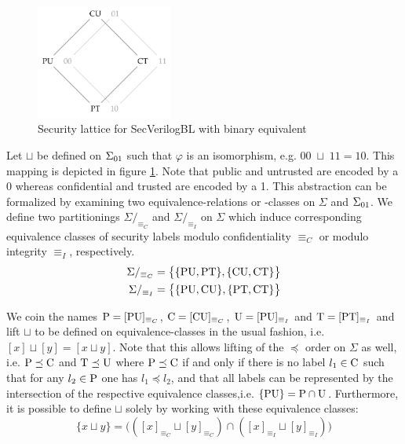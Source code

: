 \begin{figure}
    \centering
    \includegraphics[width=0.4\textwidth]{figures/binary-lattice.png}
    \caption{Security lattice for SecVerilogBL \cite{Ferraiuolo17} with binary equivalent}
    \label{fig:sec-lattice-bin}
\end{figure}

Let $ \sqcup $ be defined on $ \binSigma $ such that $ \varphi $ is an isomorphism, e.g. $ 00 \; \sqcup \; 11 = 10 $.
This mapping is depicted in figure \ref{fig:sec-lattice-bin}.
Note that public and untrusted are encoded by a 0 whereas confidential and trusted are encoded by a 1.
This abstraction can be formalized by examining two equivalence-relations or -classes on $ \Sigma $ and $ \binSigma $.
We define two partitionings $ \Sigma/_{\equiv_C} $ and $ \Sigma/_{\equiv_I} $ on $ \Sigma $ which induce corresponding equivalence classes of security labels modulo confidentiality $ \equiv_C $ or modulo integrity $ \equiv_I $, respectively.
\begin{align*}
    \Sigma /_{\equiv_C} &= \big\{ \{ \PU, \PT \}, \{ \CU, \CT \} \big\} \\
    \Sigma /_{\equiv_I} &= \big\{ \{ \PU, \CU \}, \{ \PT, \CT \} \big\}
\end{align*}

We coin the names $ \P = [\PU]_{\equiv_C} $, $ \C = [\CU]_{\equiv_C} $, $ \U = [\PU]_{\equiv_I} $ and $ \T = [\PT]_{\equiv_I} $ and lift $ \sqcup $ to be defined on equivalence-classes in the usual fashion, i.e. $ [x] \sqcup [y] = [x \sqcup y] $.
Note that this allows lifting of the $ \preceq $ order on $ \Sigma $ as well, i.e. $ \P \preceq \C $ and $ \T \preceq \U $ where $ \P \preceq \C $ if and only if there is no label $ l_1 \in \C $ such that for any $ l_2 \in \P $ one has $ l_1 \preceq l_2 $, and that all labels can be represented by the intersection of the respective equivalence classes,i.e. $ \{ \PU \} = \P \cap \U $.
Furthermore, it is possible to define $ \sqcup $ solely by working with these equivalence classes:
\begin{equation*}
    \{ x \sqcup y \} = \big(([x]_{\equiv_C} \sqcup [y]_{\equiv_C}) \cap ([x]_{\equiv_I} \sqcup [y]_{\equiv_I}) \big)
\end{equation*}

